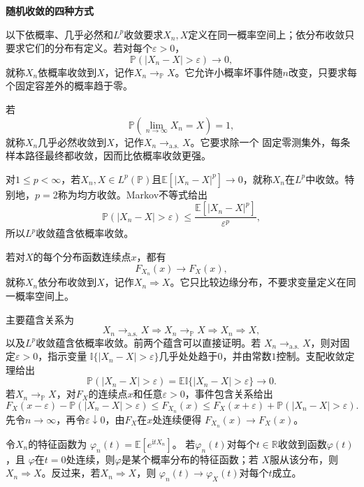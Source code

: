 \par\medskip\noindent\textbf{随机收敛的四种方式}\quad
\begin{definition}[随机变量的收敛]
  \label{def:probability-random-convergence}
以下依概率、几乎必然和\(L^p\)收敛要求\(X_n,X\)定义在同一概率空间上；依分布收敛只要求它们的分布有定义。若对每个\(\varepsilon>0\)，
\[ \mathbb{P}(|X_n-X|>\varepsilon)\to0, \]
就称\(X_n\)依概率收敛到\(X\)，记作\(X_n\to_{\mathbb{P}}X\)。它允许小概率坏事件随\(n\)改变，只要求每个固定容差外的概率趋于零。

若
\[ \mathbb{P}\left(
    \lim_{n\to\infty}X_n=X\right)=1, \]
就称\(X_n\)几乎必然收敛到\(X\)，记作\(X_n\to_{\mathrm{a.s.}}X\)。它要求除一个
固定零测集外，每条样本路径最终都收敛，因而比依概率收敛更强。

对\(1\leq p<\infty\)，若\(X_n,X\in L^p(\mathbb P)\)且\(\mathbb{E}[|X_n-X|^p]\to0\)，就称\(X_n\)在\(L^p\)中收敛。特别地，\(p=2\)称为均方收敛。Markov不等式给出
\[ \mathbb{P}(|X_n-X|>\varepsilon)
  \leq\frac{\mathbb{E}[|X_n-X|^p]}{\varepsilon^p}, \]
所以\(L^p\)收敛蕴含依概率收敛。

若对\(X\)的每个分布函数连续点\(x\)，都有
\[ F_{X_n}(x)\to F_X(x), \]
就称\(X_n\)依分布收敛到\(X\)，记作\(X_n\Rightarrow X\)。它只比较边缘分布，不要求变量定义在同一概率空间上。

\end{definition}
主要蕴含关系为
\[ X_n\to_{\mathrm{a.s.}}X
  \Longrightarrow X_n\to_{\mathbb{P}}X\Longrightarrow X_n\Rightarrow X, \]
以及\(L^p\)收敛蕴含依概率收敛。前两个蕴含可以直接证明。若
\(X_n\to_{\mathrm{a.s.}}X\)，则对固定\(\varepsilon>0\)，指示变量
\(\mathbb{I}\{|X_n-X|>\varepsilon\}\)几乎处处趋于\(0\)，并由常数\(1\)控制。支配收敛定理给出
\[
  \mathbb{P}(|X_n-X|>\varepsilon)
  =\mathbb{E}\mathbb{I}\{|X_n-X|>\varepsilon\}\to0.
\]
若\(X_n\to_{\mathbb{P}}X\)，对\(F_X\)的连续点\(x\)和任意\(\varepsilon>0\)，事件包含关系给出
\[
  F_X(x-\varepsilon)-\mathbb{P}(|X_n-X|>\varepsilon)
  \leq F_{X_n}(x)
  \leq
  F_X(x+\varepsilon)+\mathbb{P}(|X_n-X|>\varepsilon).
\]
先令\(n\to\infty\)，再令\(\varepsilon\downarrow0\)，由\(F_X\)在\(x\)处连续便得
\(F_{X_n}(x)\to F_X(x)\)。

\begin{theorem}[L\'evy连续性定理]
  \label{thm:probability-levy-continuity}
  令\(X_n\)的特征函数为
  \(\varphi_n(t)=\mathbb{E}[e^{\mathrm{i}tX_n}]\)。
  若\(\varphi_n(t)\)对每个\(t\in\mathbb{R}\)收敛到函数\(\varphi(t)\)，且
  \(\varphi\)在\(t=0\)处连续，则\(\varphi\)是某个概率分布的特征函数；若
  \(X\)服从该分布，则\(X_n\Rightarrow X\)。反过来，若\(X_n\Rightarrow X\)，则
  \(\varphi_n(t)\to\varphi_X(t)\)对每个\(t\)成立。
\end{theorem}

